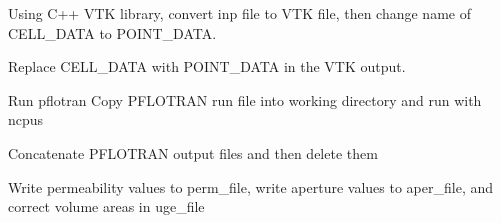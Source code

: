 \documentclass[letterpaper,10pt,english]{sphinxmanual}
\begin{document}

\begin{fulllineitems}
\label{\detokenize{pydfnworks:pydfnworks.flow.parse_pflotran_vtk}}
Using C++ VTK library, convert inp file to VTK file, then change name of CELL\_DATA to POINT\_DATA.

\end{fulllineitems}


\begin{fulllineitems}
\label{\detokenize{pydfnworks:pydfnworks.flow.parse_pflotran_vtk_python}}
Replace CELL\_DATA with POINT\_DATA in the VTK output.

\end{fulllineitems}


\begin{fulllineitems}
\label{\detokenize{pydfnworks:pydfnworks.flow.pflotran}}
Run pflotran
Copy PFLOTRAN run file into working directory and run with ncpus

\end{fulllineitems}


\begin{fulllineitems}
\label{\detokenize{pydfnworks:pydfnworks.flow.pflotran_cleanup}}
Concatenate PFLOTRAN output files and then delete them

\end{fulllineitems}


\begin{fulllineitems}
\label{\detokenize{pydfnworks:pydfnworks.flow.write_perms_and_correct_volumes_areas}}
Write permeability values to perm\_file, write aperture values to aper\_file, and correct volume areas in uge\_file

\end{fulllineitems}
\end{document}
